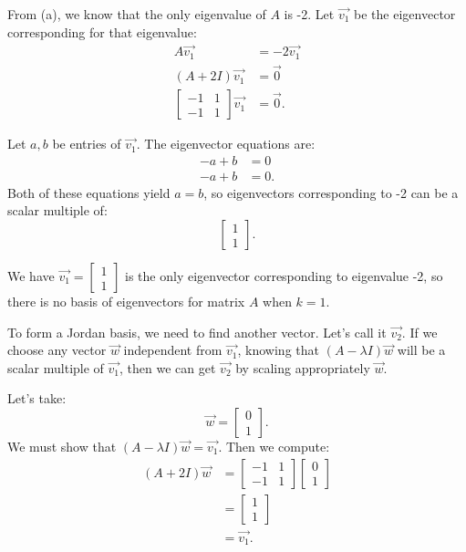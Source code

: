 \documentclass[10pt]{article}
\begin{document}
\noindent From (a), we know that the only eigenvalue of $A$ is -2. Let $\Vec{v_1}$ be the eigenvector corresponding for that eigenvalue:
\begin{align*}
    A\Vec{v_1} &= -2\Vec{v_1} \\
    (A+2I)\Vec{v_1} &= \Vec{0} \\
    \begin{bmatrix}
        -1 & 1 \\
        -1 & 1
    \end{bmatrix} \Vec{v_1} &= \Vec{0}.
\end{align*}

\noindent Let $a, b$ be entries of $\Vec{v_1}$. The eigenvector equations are:
\begin{align*}
    -a + b &= 0 \\
    -a + b &= 0.
\end{align*}
\noindent Both of these equations yield $a=b$, so eigenvectors corresponding to -2 can be a scalar multiple of:
\begin{equation*}
    \begin{bmatrix} 1 \\ 1 \end{bmatrix}.
\end{equation*}

\noindent We have $\Vec{v_1} = \begin{bmatrix} 1 \\ 1 \end{bmatrix}$ is the only eigenvector corresponding to eigenvalue -2, so there is no basis of eigenvectors for matrix $A$ when $k=1$. \par

\noindent To form a Jordan basis, we need to find another vector. Let's call it $\Vec{v_2}$. If we choose any vector $\Vec{w}$ independent from $\Vec{v_1}$, knowing that $(A-\lambda I)\Vec{w}$  will be a scalar multiple of $\Vec{v_1}$, then we can get $\Vec{v_2}$ by scaling appropriately $\Vec{w}$. \par
\noindent Let's take:
\begin{equation*}
    \Vec{w} = \begin{bmatrix} 0 \\ 1 \end{bmatrix}.
\end{equation*}
\noindent We must show that $(A-\lambda I)\Vec{w} = \Vec{v_1}$. Then we compute:
\begin{align*}
    (A+2I)\Vec{w} &=
    \begin{bmatrix}
        -1 & 1 \\
        -1 & 1
    \end{bmatrix}
    \begin{bmatrix}
        0 \\ 1
    \end{bmatrix} \\
    &= \begin{bmatrix}
        1 \\ 1
    \end{bmatrix} \\
    &= \Vec{v_1}.
\end{align*}
\end{document}
